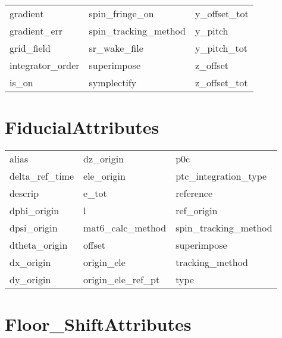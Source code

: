 \begin{tabular}{lll}
gradient                    & spin_fringe_on              & y_offset_tot                \\
gradient_err                & spin_tracking_method        & y_pitch                     \\
grid_field                  & sr_wake_file                & y_pitch_tot                 \\
integrator_order            & superimpose                 & z_offset                    \\
is_on                       & symplectify                 & z_offset_tot                \\
 \bottomrule
 \end{tabular}
 \vfill
 
 \section{FiducialAttributes}
 \label{s:list.fiducial}
 
 \begin{tabular}{lll} \toprule
alias                       & dz_origin                   & p0c                         \\
delta_ref_time              & ele_origin                  & ptc_integration_type        \\
descrip                     & e_tot                       & reference                   \\
dphi_origin                 & l                           & ref_origin                  \\
dpsi_origin                 & mat6_calc_method            & spin_tracking_method        \\
dtheta_origin               & offset                      & superimpose                 \\
dx_origin                   & origin_ele                  & tracking_method             \\
dy_origin                   & origin_ele_ref_pt           & type                        \\
 \bottomrule
 \end{tabular}
 \vfill
 
 \section{Floor_ShiftAttributes}
 \label{s:list.floor.shift}
 
